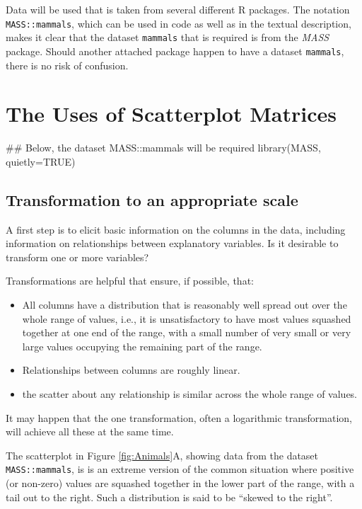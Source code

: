 \documentclass{tufte-book}\usepackage[]{graphicx}\usepackage[]{color}
\newcommand{\txtt}[1]{\texttt{#1}}
\newenvironment{itemizz}%
  {\begin{itemize} %
    \setlength{\itemsep}{2pt}%
    \setlength{\parskip}{2pt}} %
  {\end{itemize}}
\begin{document}
Data will be used that is taken from several different R packages.
The notation \txtt{MASS::mammals}, which can be used in code as well
as in the textual description, makes it clear that the dataset
\txtt{mammals} that is required is from the {\em MASS} package.
Should another attached package happen to have a dataset
\txtt{mammals}, there is no risk of confusion.

\section{The Uses of Scatterplot Matrices}

\begin{Schunk}
\begin{Sinput}
## Below, the dataset MASS::mammals will be required
library(MASS, quietly=TRUE)
\end{Sinput}
\end{Schunk}

\subsection{Transformation to an appropriate scale}

A first step is to elicit basic information on the columns in the
data, including information on relationships between explanatory
variables.  Is it desirable to transform one or more variables?

Transformations are helpful that ensure, if possible, that:
\begin{itemizz}
\item All columns have a distribution that is reasonably well spread
  out over the whole range of values, i.e., it is unsatisfactory to
  have most values squashed together at one end of the range, with a
  small number of very small or very large values occupying the
  remaining part of the range.
  \item Relationships between columns are roughly linear.
  \item the scatter about any relationship is similar across the whole
range of values.
\end{itemizz}
It may happen that the one transformation, often a logarithmic
transformation, will achieve all these at the same time.

The scatterplot in Figure \ref{fig:Animals}A, showing data from the
dataset \txtt{MASS::mammals}, is is an extreme version of the
common situation where positive (or non-zero) values are squashed
together in the lower part of the range, with a tail out to the right.
Such a distribution is said to be ``skewed to the right''.
\end{document}
